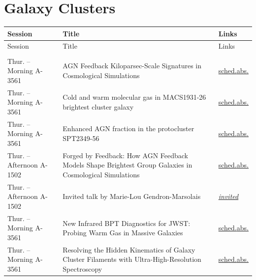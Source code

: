 \section*{Galaxy Clusters}
{\small
\setlength{\emergencystretch}{1em}
\begin{longtable}{@{}>{\TableRaggedRight\arraybackslash\hspace{0pt}}p{} >{\TableRaggedRight\arraybackslash\hspace{0pt}}p{} >{\TableRaggedRight\arraybackslash\hspace{0pt}}p{}@{}}
\toprule
Session & Title & Links \\
\midrule
\endfirsthead
\toprule
Session & Title & Links \\
\midrule
\endhead
\addlinespace[0.15em]
\multicolumn{3}{@{}l}{\sffamily\bfseries\color{cascateal} Talks} \\
\addlinespace[0.1em]
Thur. -- Morning A-3561 & AGN Feedback Kiloparsec-Scale Signatures in Cosmological Simulations & \hyperlink{schedule-talk-18}{sched.}\newline \hyperlink{abstract-talk-18}{abs.} \\
Thur. -- Morning A-3561 & Cold and warm molecular gas in MACS1931-26 brightest cluster galaxy & \hyperlink{schedule-talk-145}{sched.}\newline \hyperlink{abstract-talk-145}{abs.} \\
Thur. -- Morning A-3561 & Enhanced AGN fraction in the protocluster SPT2349-56 & \hyperlink{schedule-talk-327}{sched.}\newline \hyperlink{abstract-talk-327}{abs.} \\
Thur. -- Afternoon A-1502 & Forged by Feedback: How AGN Feedback Models Shape Brightest Group Galaxies in Cosmological Simulations & \hyperlink{schedule-talk-29}{sched.}\newline \hyperlink{abstract-talk-29}{abs.} \\
Thur. -- Afternoon A-1502 & Invited talk by Marie-Lou Gendron-Marsolais & \hyperlink{invited-marie-lou-gendron-marsolais}{\textit{invited}} \\
Thur. -- Morning A-3561 & New Infrared BPT Diagnostics for JWST: Probing Warm Gas in Massive Galaxies & \hyperlink{schedule-talk-184}{sched.}\newline \hyperlink{abstract-talk-184}{abs.} \\
Thur. -- Morning A-3561 & Resolving the Hidden Kinematics of Galaxy Cluster Filaments with Ultra-High-Resolution Spectroscopy & \hyperlink{schedule-talk-5}{sched.}\newline \hyperlink{abstract-talk-5}{abs.} \\

\end{longtable}}
